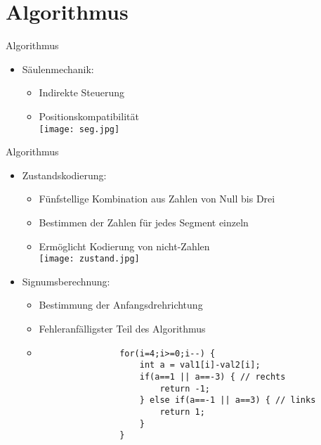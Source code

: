 \documentclass{beamer}
\begin{document}
\section{Algorithmus}
\begin{frame}{Algorithmus}
\begin{itemize}
	\item Säulenmechanik:
	\begin{itemize}
		\item Indirekte Steuerung
		\item Positionskompatibilität\\
		\texttt{[image: seg.jpg]}
	\end{itemize}
\end{itemize}
\end{frame}
\begin{frame}[fragile]{Algorithmus}
\begin{itemize}
	\item Zustandskodierung:
	\begin{itemize}
		\item Fünfstellige Kombination aus Zahlen von Null bis Drei
		\item Bestimmen der Zahlen für jedes Segment einzeln
		\item Ermöglicht Kodierung von nicht-Zahlen\\
		\texttt{[image: zustand.jpg]}
	\end{itemize}
	\item<2> Signumsberechnung:
	\begin{itemize}
		\item Bestimmung der Anfangsdrehrichtung
		\item Fehleranfälligster Teil des Algorithmus
		\vspace{.3em}
		\item {\tiny\begin{verbatim}
				for(i=4;i>=0;i--) {
				    int a = val1[i]-val2[i];
				    if(a==1 || a==-3) { // rechts
				        return -1;
				    } else if(a==-1 || a==3) { // links
				        return 1;
				    }
				}
			\end{verbatim}
			}
	\end{itemize}
\end{itemize}
\end{frame}
\end{document}
